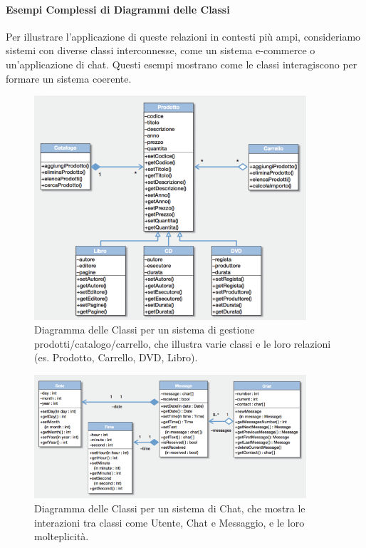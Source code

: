 \paragraph{Esempi Complessi di Diagrammi delle Classi}
Per illustrare l'applicazione di queste relazioni in contesti più ampi, consideriamo sistemi con diverse classi interconnesse, come un sistema e-commerce o un'applicazione di chat. Questi esempi mostrano come le classi interagiscono per formare un sistema coerente.
\begin{figure}[h!]
    \centering
    \includegraphics[width=0.9\textwidth]{immagini/uml_class_sistema_e_commerce.png} %
    \caption{Diagramma delle Classi per un sistema di gestione prodotti/catalogo/carrello, che illustra varie classi e le loro relazioni (es. Prodotto, Carrello, DVD, Libro).}
    \label{fig:class_sistema_e_commerce}
\end{figure}
\begin{figure}[h!]
    \centering
    \includegraphics[width=0.9\textwidth]{immagini/uml_class_sistema_chat_corretto.png} %
    \caption{Diagramma delle Classi per un sistema di Chat, che mostra le interazioni tra classi come Utente, Chat e Messaggio, e le loro molteplicità.}
    \label{fig:class_sistema_chat}
\end{figure}

